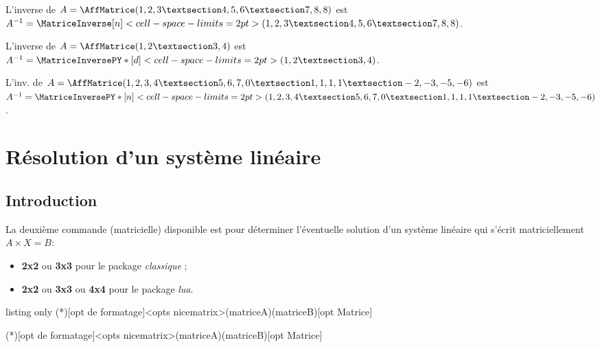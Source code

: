 \documentclass[a4paper,11pt]{article}
\begin{document}
\begin{PresentationCode}{}
L'inverse de $A=\AffMatrice(1,2,3 § 4,5,6 § 7,8,8)$ est
$A^{-1}=\MatriceInverse[n]<cell-space-limits=2pt>(1,2,3 § 4,5,6 § 7,8,8)$.
\end{PresentationCode}

\begin{PresentationCode}{}
L'inverse de $A=\AffMatrice(1,2 § 3,4)$ est
$A^{-1}=\MatriceInversePY*[d]<cell-space-limits=2pt>(1,2 § 3,4)$.
\end{PresentationCode}

\begin{PresentationCode}{}
L'inv. de $A=\AffMatrice(1,2,3,4 § 5,6,7,0 § 1,1,1,1 § -2,-3,-5,-6)$ est
$A^{-1}=
\MatriceInversePY*[n]<cell-space-limits=2pt>(1,2,3,4 § 5,6,7,0 § 1,1,1,1 § -2,-3,-5,-6)$.
\end{PresentationCode}

\section{Résolution d'un système linéaire}

\subsection{Introduction}

\begin{cautionblock}
La deuxième commande (matricielle) disponible est pour déterminer l'éventuelle solution d'un système linéaire  qui s'écrit matriciellement $A\times X=B$:

\begin{itemize}
	\item \textbf{2x2} ou \textbf{3x3} pour le package \textit{classique} ;
	\item \textbf{2x2} ou \textbf{3x3} ou \textbf{4x4} pour le package \textit{lua}.
\end{itemize}
\vspace*{-\baselineskip}\leavevmode
\end{cautionblock}

\begin{PresentationCode}{listing only}
\SolutionSysteme(*)[opt de formatage]<opts nicematrix>(matriceA)(matriceB)[opt Matrice]

\SolutionSystemePY(*)[opt de formatage]<opts nicematrix>(matriceA)(matriceB)[opt Matrice]
\end{PresentationCode}
\end{document}
